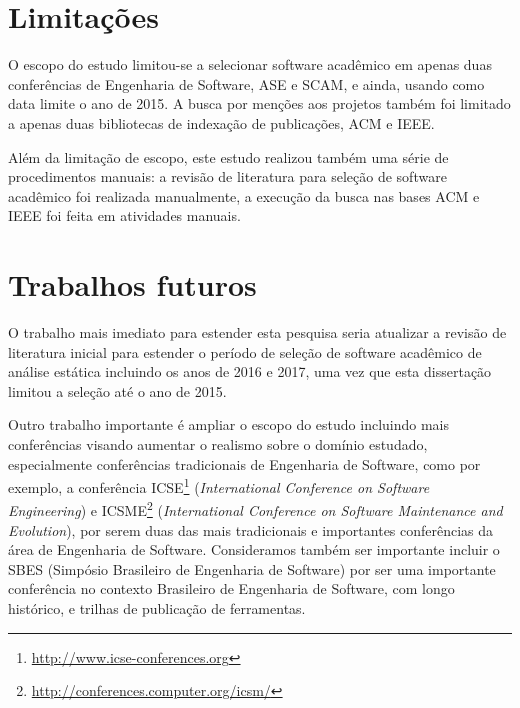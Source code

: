 
\section{Limitações}


O escopo do estudo limitou-se a selecionar software acadêmico em apenas
duas conferências de
Engenharia de Software, ASE e SCAM, e ainda, usando como data limite o ano de
2015. A busca por menções aos projetos também foi limitado a apenas duas
bibliotecas de indexação de publicações, ACM e IEEE.


Além da limitação de escopo, este estudo realizou também uma série de
procedimentos manuais: a revisão de literatura para seleção de software
acadêmico foi realizada manualmente, a execução da busca nas bases ACM e IEEE
foi feita em atividades manuais.


\section{Trabalhos futuros}


O trabalho mais imediato para estender esta pesquisa seria atualizar a revisão
de literatura inicial para estender o período de seleção de software acadêmico
de análise estática incluindo os anos de 2016 e 2017, uma vez que esta
dissertação limitou a seleção até o ano de 2015.

Outro trabalho importante é ampliar o escopo do estudo incluindo mais
conferências visando aumentar o realismo sobre o domínio estudado,
especialmente conferências tradicionais de Engenharia de Software, como por
exemplo, a conferência ICSE\footnote{\url{http://www.icse-conferences.org}}
({\it International Conference on Software Engineering}) e
ICSME\footnote{\url{http://conferences.computer.org/icsm/}} ({\it International
Conference on Software Maintenance and Evolution}), por serem duas das mais
tradicionais e importantes conferências da área de Engenharia de Software.
Consideramos também ser importante incluir o SBES (Simpósio Brasileiro de
Engenharia de Software) por ser uma importante conferência no contexto
Brasileiro de Engenharia de Software, com longo histórico, e trilhas de
publicação de ferramentas.

